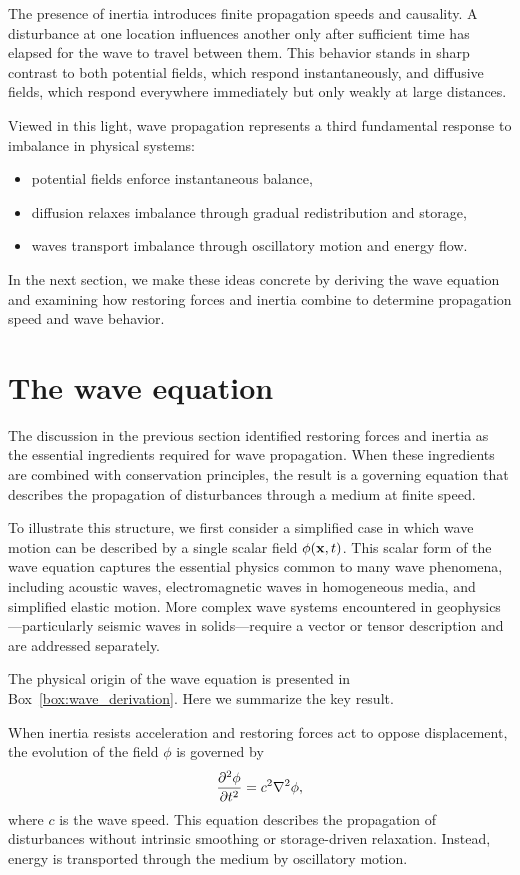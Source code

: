 The presence of inertia introduces finite propagation speeds and causality. A disturbance at one location influences another only after sufficient time has elapsed for the wave to travel between them. This behavior stands in sharp contrast to both potential fields, which respond instantaneously, and diffusive fields, which respond everywhere immediately but only weakly at large distances.

Viewed in this light, wave propagation represents a third fundamental response to imbalance in physical systems:
\begin{itemize}
    \item potential fields enforce instantaneous balance,
    \item diffusion relaxes imbalance through gradual redistribution and storage,
    \item waves transport imbalance through oscillatory motion and energy flow.
\end{itemize}

In the next section, we make these ideas concrete by deriving the wave equation and examining how restoring forces and inertia combine to determine propagation speed and wave behavior.

\section{The wave equation}

The discussion in the previous section identified restoring forces and inertia as the essential ingredients required for wave propagation. When these ingredients are combined with conservation principles, the result is a governing equation that describes the propagation of disturbances through a medium at finite speed.

To illustrate this structure, we first consider a simplified case in which wave motion can be described by a single scalar field $\phi(\vb{x},t)$. This scalar form of the wave equation captures the essential physics common to many wave phenomena, including acoustic waves, electromagnetic waves in homogeneous media, and simplified elastic motion. More complex wave systems encountered in geophysics—particularly seismic waves in solids—require a vector or tensor description and are addressed separately.

The physical origin of the wave equation is presented in Box~\ref{box:wave_derivation}.  Here we summarize the key result.

When inertia resists acceleration and restoring forces act to oppose displacement, the evolution of the field $\phi$ is governed by
\[
    \pdv[2]{\phi}{t} = c^2 \laplacian \phi,
\]
where $c$ is the wave speed. This equation describes the propagation of disturbances without intrinsic smoothing or storage-driven relaxation. Instead, energy is transported through the medium by oscillatory motion.


